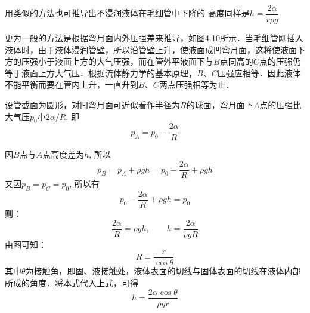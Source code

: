 用类似的方法也可推导出不浸润液体在毛细管中下降的
高度同样是$h=\dfrac{2\alpha}{r\rho g}$.

更为一般的方法是根据弯月面内外压强差来推导，如图4.10所示．当毛细管刚插入液体时，由于液体浸润管壁，所以沿管壁上升，使液面成凹弯月面，这将使液面下方的压强小于液面上方的大气压强，而在管外平液面下与$B$点同高的$C$点的压强仍等于液面上方大气压．根据流体静力学的基本原理，$B$、$C$压强应相等．因此液体不能平衡而要在管内上升，一直升到$B$、$C$两点压强相等为止．

设管截面为圆形，对凹弯月面可近似看作半径为$R$的球面，弯月面下$A$点的压强比大气压$p_0$小$2\alpha/R$, 即
\[p_A=p_0-\frac{2\alpha}{R}\]

因$B$点与$A$点高度差为$h$, 所以
\[p_B=p_A+\rho gh=p_0-\frac{2\alpha}{R}+\rho gh\]
又因$p_B=p_C=p_0$, 所以有
\[p_0-\frac{2\alpha}{R}+\rho gh=p_0\]
则：
\[\frac{2\alpha}{R}=\rho gh,\qquad h=\frac{2\alpha}{\rho gR}\]
由图可知：
\[R=\frac{r}{\cos\theta}\]
其中$\theta$为接触角，即固、液接触处，液体表面的切线与固体表面的切线在液体内部所成的角度．将本式代入上式，可得
\[h=\frac{2\alpha\cos\theta}{\rho gr}\]

